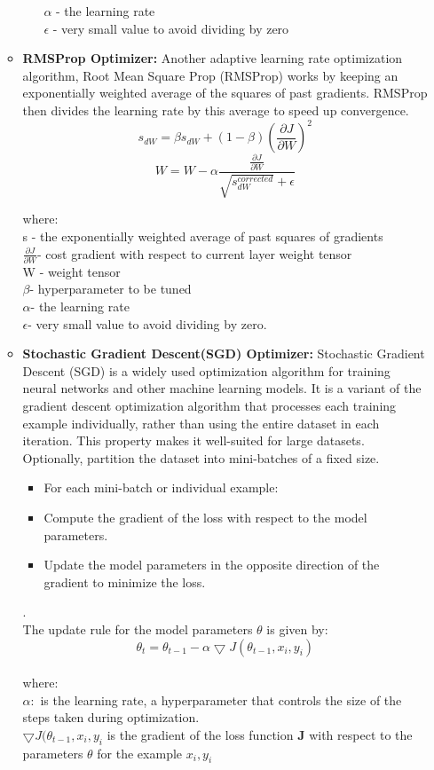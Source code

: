 \begin{itemize}
\begin{itemize}
\begin{itemize}
        $\alpha$ - the learning rate\\
        $\epsilon$ - very small value to avoid dividing by zero\\
    \end{itemize}
    \item \textbf{RMSProp Optimizer: } Another adaptive learning rate optimization algorithm, Root Mean Square Prop (RMSProp) works by keeping an exponentially weighted average of the squares of past gradients. RMSProp then divides the learning rate by this average to speed up convergence.
    \[
    s_{dW} = \beta s_{dW} + (1-\beta)\left(\frac{\partial J}{\partial W}\right)^{2}
    \]
    \[
    W = W-\alpha\frac{\frac{\partial J}{\partial W}}{\sqrt{s_{dW}^{corrected}}+ \epsilon}
    \]
    
    where: \\
    s - the exponentially weighted average of past squares of gradients\\
    $\frac{\partial J}{\partial W}$-  cost gradient with respect to current layer weight tensor\\
    W - weight tensor\\
    $\beta$- hyperparameter to be tuned\\
    $\alpha$- the learning rate\\
    $\epsilon$- very small value to avoid dividing by zero.
    \item \textbf{Stochastic Gradient Descent(SGD) Optimizer: } Stochastic Gradient Descent (SGD) is a widely used optimization algorithm for training neural networks and other machine learning models. It is a variant of the gradient descent optimization algorithm that processes each training example individually, rather than using the entire dataset in each iteration. This property makes it well-suited for large datasets. Optionally, partition the dataset into mini-batches of a fixed size.
    \begin{itemize}
        \item For each mini-batch or individual example:
        \item Compute the gradient of the loss with respect to the model parameters.
        \item Update the model parameters in the opposite direction of the gradient to minimize the loss.
    \end{itemize}.\\
    The update rule for the model parameters $\theta$ is given by:
    \[
    \theta_{t} = \theta_{t-1}-\alpha\bigtriangledown J(\theta_{t-1},x_{i}, y_{i})
    \]\\
    where: \\
    $\alpha : $  is the learning rate, a hyperparameter that controls the size of the steps taken during optimization.\\
    $\bigtriangledown J(\theta_{t-1},x_{i}, y_{i}$ is the gradient of the loss function $\mathbf{J}$ with respect to the parameters $\theta$ for the example $x_{i}, y_{i}$
\end{itemize}




\end{itemize}
